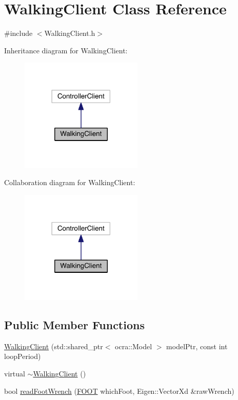 \hypertarget{classWalkingClient}{}\section{Walking\+Client Class Reference}
\label{classWalkingClient}


{\ttfamily \#include $<$Walking\+Client.\+h$>$}



Inheritance diagram for Walking\+Client\+:\nopagebreak
\begin{figure}[H]
\begin{center}
\leavevmode
\includegraphics[width=165pt]{classWalkingClient__inherit__graph}
\end{center}
\end{figure}


Collaboration diagram for Walking\+Client\+:\nopagebreak
\begin{figure}[H]
\begin{center}
\leavevmode
\includegraphics[width=165pt]{classWalkingClient__coll__graph}
\end{center}
\end{figure}
\subsection*{Public Member Functions}
\begin{DoxyCompactItemize}
\item 
\hyperlink{classWalkingClient_a6c9002a44a54814c4b482739824e39aa}{Walking\+Client} (std\+::shared\+\_\+ptr$<$ ocra\+::\+Model $>$ model\+Ptr, const int loop\+Period)
\item 
virtual \hyperlink{classWalkingClient_a1dbc0308f844aea6542750104fddf8e2}{$\sim$\+Walking\+Client} ()
\item 
bool \hyperlink{classWalkingClient_a03ea2313c954a97aeb4d5b614f3e6caa}{read\+Foot\+Wrench} (\hyperlink{ZmpController_8h_a4b6a8e135f90bd56e5a57a60efb42529}{F\+O\+OT} which\+Foot, Eigen\+::\+Vector\+Xd \&raw\+Wrench)
\end{DoxyCompactItemize}
